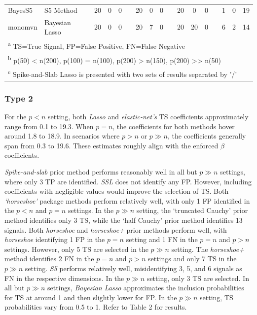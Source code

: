 \documentclass[
  11pt,
]{article}
\begin{document}
\begin{landscape}
\begin{table}[H]
\begin{tabular}[t]{>{}l|>{}l|>{}c|>{}c|>{}c|>{}c|>{}c|>{}c|>{}c|>{}c|>{}c|>{}c|>{}c|>{}c|>{}c|>{}c|>{}c|}
\hspace{1em}BayesS5 & S5 Method & 20 & 0 & 0 &  & 20 & 0 & 0 &  & 20 & 0 & 0 &  & 1 & 0 & 19\\
\hspace{1em}monomvn & Bayesian Lasso & 20 & 0 & 0 &  & 20 & 7 & 0 &  & 20 & 20 & 0 &  & 6 & 2 & 14\\
\bottomrule
\multicolumn{17}{l}{\textsuperscript{a} TS=True Signal, FP=False Positive, FN=False Negative}\\
\multicolumn{17}{l}{\textsuperscript{b} p(50) < n(200), p(100) = n(100), p(200) > n(150), p(200) >> n(50)}\\
\multicolumn{17}{l}{\textsuperscript{c} Spike-and-Slab Lasso is presented with two sets of results separated by '/'}\\
\end{tabular}
\end{table}

\end{landscape}

\subsubsection{Type 2}

For the \(p<n\) setting, both \emph{Lasso} and \emph{elastic-net's} TS
coefficients approximately range from 0.1 to 19.3. When \(p=n\), the
coefficients for both methods hover around 1.8 to 18.9. In scenarios
where \(p > n\) or \(p \gg n\), the coefficients generally span from 0.3
to 19.6. These estimates roughly align with the enforced \(\beta\)
coefficients.

\emph{Spike-and-slab} prior method performs reasonably well in all but
\(p \gg n\) settings, where only 3 TP are identified. \emph{SSL} does
not identify any FP. However, including coefficients with negligible
values would improve the selection of TS. Both \emph{`horseshoe'}
package methods perform relatively well, with only 1 FP identified in
the \(p<n\) and \(p=n\) settings. In the \(p \gg n\) setting, the
`truncated Cauchy' prior method identifies only 3 TS, while the `half
Cauchy' prior method identifies 13 signals. Both \emph{horseshoe} and
\emph{horseshoe+} prior methods perform well, with \emph{horseshoe}
identifying 1 FP in the \(p=n\) setting and 1 FN in the \(p=n\) and
\(p>n\) settings. However, only 5 TS are selected in the \(p \gg n\)
setting. The \emph{horseshoe+} method identifies 2 FN in the \(p=n\) and
\(p>n\) settings and only 7 TS in the \(p \gg n\) setting. \emph{S5}
performs relatively well, misidentifying 3, 5, and 6 signals as FN in
the respective dimensions. In the \(p \gg n\) setting, only 3 TS are
selected. In all but \(p \gg n\) settings, \emph{Bayesian Lasso}
approximates the inclusion probabilities for TS at around 1 and then
slightly lower for FP. In the \(p \gg n\) setting, TS probabilities vary
from 0.5 to 1. Refer to Table 2 for results.
\end{document}
